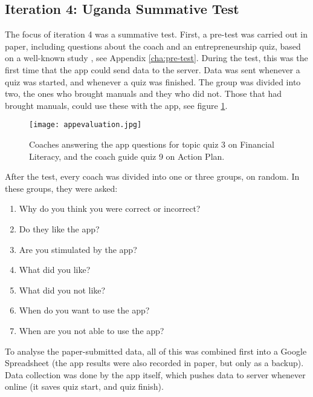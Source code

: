 \subsection{Iteration 4: Uganda Summative Test}

The focus of iteration 4 was a summative test. First, a pre-test was carried out in paper, including questions about the coach and an entrepreneurship quiz, based on a well-known study \citep{general-entrepreneurship-quiz}, see Appendix \ref{cha:pre-test}. During the test, this was the first time that the app could send data to the server. Data was sent whenever a quiz was started, and whenever a quiz was finished. The group was divided into two, the ones who brought manuals and they who did not. Those that had brought manuals, could use these with the app, see figure \ref{fig:appevaluation}.

\begin{figure}[h]
    \centering
    \texttt{[image: appevaluation.jpg]}
    \caption{Coaches answering the app questions for topic quiz 3 on Financial Literacy, and the coach guide quiz 9 on Action Plan.}
    \label{fig:appevaluation}
\end{figure}

After the test, every coach was divided into one or three groups, on random. In these groups, they were asked:

\begin{enumerate}
\item Why do you think you were correct or incorrect?
\item Do they like the app?
\item Are you stimulated by the app?
\item What did you like?
\item What did you not like?
\item When do you want to use the app?
\item When are you not able to use the app?
\end{enumerate}

To analyse the paper-submitted data, all of this was combined first into a Google Spreadsheet (the app results were also recorded in paper, but only as a backup). Data collection was done by the app itself, which pushes data to server whenever online (it saves quiz start, and quiz finish).


